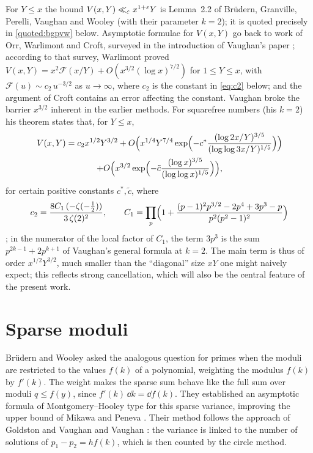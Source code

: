 For $Y\le x$ the bound $V(x,Y)\ll_\varepsilon x^{1+\varepsilon}Y$ is Lemma~2.2 of Brüdern, Granville, Perelli, Vaughan and Wooley \cite{bgpvw1998} (with their parameter $k=2$); it is quoted precisely in \cref{quoted:bgpvw} below. Asymptotic formulae for $V(x,Y)$ go back to work of Orr, Warlimont and Croft, surveyed in the introduction of Vaughan's paper \cite{vaughan2005}; according to that survey, Warlimont \cite{warlimont1980} proved $V(x,Y)=x^2\mathcal F(x/Y)+O(x^{3/2}(\log x)^{7/2})$ for $1\le Y\le x$, with $\mathcal F(u)\sim c_2\,u^{-3/2}$ as $u\to\infty$, where $c_2$ is the constant in \eqref{eq:c2} below; and the argument of Croft \cite{croft1975} contains an error affecting the constant. Vaughan \cite[Theorem]{vaughan2005} broke the barrier $x^{3/2}$ inherent in the earlier methods. For squarefree numbers (his $k=2$) his theorem states that, for $Y\le x$,
\begin{multline}\label{eq:vaughan}
V(x,Y)=c_2x^{1/2}Y^{3/2}+O\Bigl(x^{1/4}Y^{7/4}\exp\Bigl(-c^*\frac{(\log 2x/Y)^{3/5}}{(\log\log 3x/Y)^{1/5}}\Bigr)\Bigr)\\
+O\Bigl(x^{3/2}\exp\Bigl(-\tilde c\frac{(\log x)^{3/5}}{(\log\log x)^{1/5}}\Bigr)\Bigr),
\end{multline}
for certain positive constants $c^*,\tilde c$, where
\begin{equation}\label{eq:c2}
c_2=\frac{8C_1\,(-\zeta(-\frac12))}{3\,\zeta(2)^2},\qquad
C_1=\prod_p\Bigl(1+\frac{(p-1)^2p^{3/2}-2p^4+3p^3-p}{p^2(p^2-1)^2}\Bigr)
\end{equation}
\cite[(1.13)--(1.15)]{vaughan2005}; in the numerator of the local factor of $C_1$, the term $3p^3$ is the sum $p^{2k-1}+2p^{k+1}$ of Vaughan's general formula at $k=2$. The main term is thus of order $x^{1/2}Y^{3/2}$, much smaller than the ``diagonal'' size $xY$ one might naively expect; this reflects strong cancellation, which will also be the central feature of the present work.

\section{Sparse moduli}

Brüdern and Wooley \cite{bruedernwooley2011} asked the analogous question for primes when the moduli are restricted to the values $f(k)$ of a polynomial, weighting the modulus $f(k)$ by $f'(k)$. The weight makes the sparse sum behave like the full sum over moduli $q\le f(y)$, since $f'(k)\,\dd k=\dd f(k)$. They established an asymptotic formula of Montgomery--Hooley type for this sparse variance, improving the upper bound of Mikawa and Peneva \cite{mikawapeneva2005}. Their method follows the approach of Goldston and Vaughan \cite{goldstonvaughan1997} and Vaughan \cite{vaughan1998a}: the variance is linked to the number of solutions of $p_1-p_2=hf(k)$, which is then counted by the circle method.

